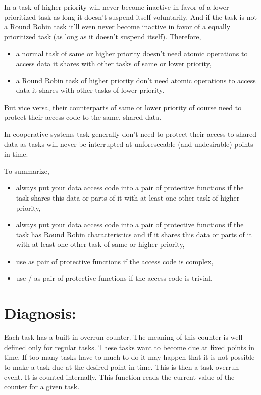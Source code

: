 In \rtos{} a task of higher priority will never become inactive in favor
of a lower prioritized task as long it doesn't suspend itself voluntarily.
And if the task is not a Round Robin task it'll even never become inactive
in favor of a equally prioritized task (as long as it doesn't suspend
itself). Therefore,
\begin{itemize}
  \item a normal task of same or higher priority doesn't need atomic
    operations to access data it shares with other tasks of same or lower
    priority,
  \item a Round Robin task of higher priority don't need atomic operations
    to access data it shares with other tasks of lower priority.
\end{itemize}
But vice versa, their counterparts of same or lower priority of course need to
protect their access code to the same, shared data.

In cooperative systems task generally don't need to protect their access
to shared data as tasks will never be interrupted at unforeseeable (and
undesirable) points in time.

To summarize, 
\begin{itemize}
  \item always put your data access code into a pair of protective
    functions if the task shares this data or parts of it with at least
    one other task of higher priority,
  \item always put your data access code into a pair of protective
    functions if the task has Round Robin characteristics and if it shares
    this data or parts of it with at least one other task of same or higher
    priority,
  \item use  as pair of protective
    functions if the access code is complex,
  \item use / as pair of protective functions if the
    access code is trivial.
\end{itemize}


\section{Diagnosis: }

Each task has a built-in overrun counter. The meaning of this counter is
well defined only for regular tasks. These tasks want to become due at
fixed points in time. If too many tasks have to much to do it may happen
that it is not possible to make a task due at the desired point in time.
This is then a task overrun event. It is counted internally. This function
reads the current value of the counter for a given task.


